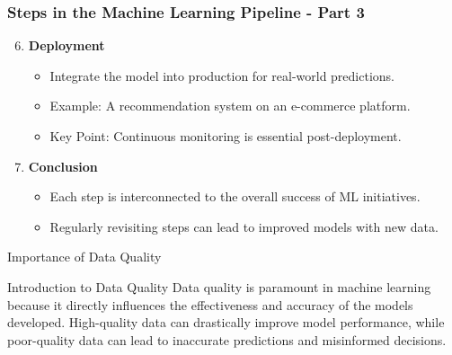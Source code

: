 \documentclass[aspectratio=169]{beamer}
\begin{document}
\begin{frame}[fragile]
    \frametitle{Steps in the Machine Learning Pipeline - Part 3}
    \begin{enumerate}
        \setcounter{enumi}{5} %
        \item \textbf{Deployment}
        \begin{itemize}
            \item Integrate the model into production for real-world predictions.
            \item Example: A recommendation system on an e-commerce platform.
            \item Key Point: Continuous monitoring is essential post-deployment.
        \end{itemize}
        
        \item \textbf{Conclusion}
        \begin{itemize}
            \item Each step is interconnected to the overall success of ML initiatives.
            \item Regularly revisiting steps can lead to improved models with new data.
        \end{itemize}
    \end{enumerate}
\end{frame}

\begin{frame}{Importance of Data Quality}
    \begin{block}{Introduction to Data Quality}
        Data quality is paramount in machine learning because it directly influences the effectiveness and accuracy of the models developed. High-quality data can drastically improve model performance, while poor-quality data can lead to inaccurate predictions and misinformed decisions.
    \end{block}
\end{frame}
\end{document}
